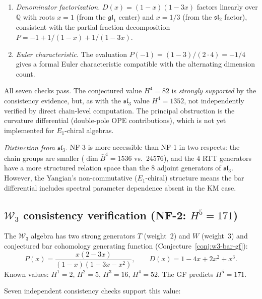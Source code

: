 \begin{enumerate}[label=(\roman*)]
\item \emph{Denominator factorization.}
$D(x) = (1-x)(1-3x)$ factors linearly over $\mathbb{Q}$
with roots $x = 1$ (from the $\mathfrak{gl}_1$ center)
and $x = 1/3$ (from the $\mathfrak{sl}_2$ factor),
consistent with the partial fraction decomposition
$P = -1 + 1/(1-x) + 1/(1-3x)$.

\item \emph{Euler characteristic.}
The evaluation $P(-1) = (1-3)/(2 \cdot 4) = -1/4$ gives a
formal Euler characteristic compatible with the alternating
dimension count.
\end{enumerate}

\noindent
All seven checks pass. The conjectured value $H^4 = 82$
is \emph{strongly supported} by the consistency evidence,
but, as with the $\mathfrak{sl}_3$ value $H^4 = 1352$,
not independently verified by direct chain-level computation.
The principal obstruction is the curvature differential
(double-pole OPE contributions), which is not yet implemented
for $E_1$-chiral algebras.

\emph{Distinction from $\widehat{\mathfrak{sl}}_3$.}
NF-3 is more accessible than NF-1 in two respects:
the chain groups are smaller ($\dim \bar{B}^4 = 1536$
vs.\ $24576$), and the $4$ RTT generators have a more
structured relation space than the $8$ adjoint generators
of $\mathfrak{sl}_3$. However, the Yangian's non-commutative
($E_1$-chiral) structure means the bar differential includes
spectral parameter dependence absent in the KM case.


\subsection{$\mathcal{W}_3$ consistency verification (NF-2: $H^5 = 171$)}
\label{subsec:w3-h5-verification}

The $\mathcal{W}_3$ algebra has two strong generators $T$ (weight~$2$)
and $W$ (weight~$3$) and conjectured bar cohomology generating function
(Conjecture~\ref{conj:w3-bar-gf}):
\[
 P(x) = \frac{x(2 - 3x)}{(1-x)(1 - 3x - x^2)}, \qquad
 D(x) = 1 - 4x + 2x^2 + x^3.
\]
Known values: $H^1 = 2$, $H^2 = 5$, $H^3 = 16$, $H^4 = 52$.
The GF predicts $H^5 = 171$.

Seven independent consistency checks support this value:

